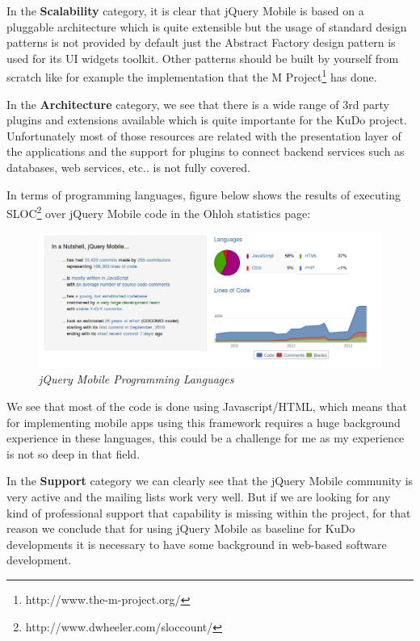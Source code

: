 \documentclass[a4paper,12pt]{book}
\begin{document}
In the \textbf{Scalability} category, it is clear that jQuery Mobile is based on a pluggable architecture which is quite extensible but the usage of standard design patterns is not provided by default just the Abstract Factory design pattern is used for its UI widgets toolkit. Other patterns should be built by yourself from scratch like for example the implementation that the M Project\footnote{http://www.the-m-project.org/}  has done.

In the \textbf{Architecture} category, we see that there is a wide range of 3rd party plugins and extensions\cite{jQuery Mobile resources} available which is quite importante for the KuDo project. Unfortunately most of those resources are related with the presentation layer of the applications and the support for plugins to connect backend services such as databases, web services, etc.. is not fully covered. 

In terms of programming languages, figure below shows the results of executing SLOC\footnote{http://www.dwheeler.com/sloccount/} over jQuery Mobile code in the Ohloh statistics page:

\begin{figure}[H]
    \centering
    \includegraphics[width=15cm, keepaspectratio]{img/jquerylanguages.png}
    \caption{\textit{jQuery Mobile Programming Languages}}
    \label{figure:jquerylanguages}
 \end{figure}

We see that most of the code is done using Javascript/HTML, which means that for implementing mobile apps using this framework requires a huge background experience in these languages, this could be a challenge for me as my experience is not so deep in that field.

In the \textbf{Support} category we can clearly see that the jQuery Mobile community is very active and the mailing lists work very well. But if we are looking for any kind of professional support that capability is missing within the project, for that reason we conclude that for using jQuery Mobile as baseline for KuDo developments it is necessary to have some background in web-based software development.
\end{document}
